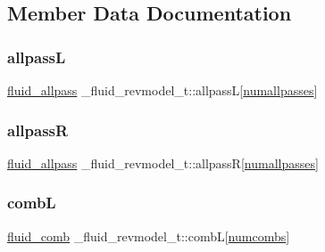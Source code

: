 \subsection{Member Data Documentation}
\mbox{\label{struct__fluid__revmodel__t_a56e9df9d5903ee9d9af98f229bb929e2}} 
\subsubsection{\texorpdfstring{allpassL}{allpassL}}
{\footnotesize\ttfamily \hyperlink{fluid__rev_8c_a749cce96bf2a255ebe77f1ef33743f8e}{fluid\+\_\+allpass} \+\_\+fluid\+\_\+revmodel\+\_\+t\+::allpassL\mbox{[}\hyperlink{fluid__rev_8c_a8ffe8f6a09d788e2ff49a1fb151790af}{numallpasses}\mbox{]}}

\mbox{\label{struct__fluid__revmodel__t_a6aac0eff2a50622041a0f5538415e812}} 
\subsubsection{\texorpdfstring{allpassR}{allpassR}}
{\footnotesize\ttfamily \hyperlink{fluid__rev_8c_a749cce96bf2a255ebe77f1ef33743f8e}{fluid\+\_\+allpass} \+\_\+fluid\+\_\+revmodel\+\_\+t\+::allpassR\mbox{[}\hyperlink{fluid__rev_8c_a8ffe8f6a09d788e2ff49a1fb151790af}{numallpasses}\mbox{]}}

\mbox{\label{struct__fluid__revmodel__t_a78e7a6f22b55f0477fce68477e90ee07}} 
\subsubsection{\texorpdfstring{combL}{combL}}
{\footnotesize\ttfamily \hyperlink{fluid__rev_8c_a624b5fdff309d5b75383f8bf860c1e8b}{fluid\+\_\+comb} \+\_\+fluid\+\_\+revmodel\+\_\+t\+::combL\mbox{[}\hyperlink{fluid__rev_8c_af9d1d366b6c476c1a4a2c2ce3ec3a70f}{numcombs}\mbox{]}}

